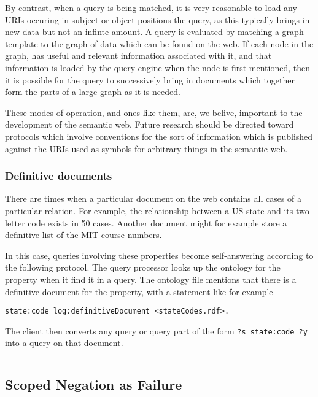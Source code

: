 \documentclass{tlp}
\begin{document}
\par By contrast, when a query is being matched, it is very
reasonable to load any URIs occuring in subject or object positions
the query, as this typically brings in new data but not an infinte
amount. A query is evaluated by matching a graph template to the
graph of data which can be found on the web. If each node in the
graph, has useful and relevant information associated with it, and
that information is loaded by the query engine when the node is
first mentioned, then it is possible for the query to successively
bring in documents which together form the parts of a large graph
as it is needed.

\par These modes of operation, and ones like them, are, we belive,
important to the development of the semantic web. Future research
should be directed toward protocols which involve conventions for
the sort of information which is published against the URIs used as
symbols for arbitrary things in the semantic web.
\subsubsection{Definitive documents}
  

\par There are times when a particular document on the web contains
all cases of a particular relation. For example, the relationship
between a US state and its two letter code exists in 50 cases.
Another document might for example store a definitive list of the
MIT course numbers.

\par In this case, queries involving these properties become
self-answering according to the following protocol. The query
processor looks up the ontology for the property when it find it in
a query. The ontology file mentions that there is a definitive
document for the property, with a statement like for example
\begin{verbatim}
state:code log:definitiveDocument <stateCodes.rdf>.
\end{verbatim}

\par The client then converts any query or query part of the form
{\tt ?s state:code ?y} into a query on that document.
\begin{verbatim}

\end{verbatim}
\subsection{Scoped Negation as Failure}
  
\end{document}
